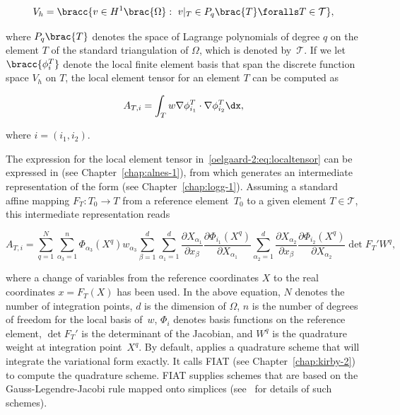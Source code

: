 \begin{equation}
  V_{h} = \bracc{v \in H^{1}\brac{\Omega}: \ v\vert_T \in P_{q}\brac{T}
    \foralls T \in \mathcal{T}},
  \label{oelgaard-2:eq:space_H1}
\end{equation}

where $P_{q}\brac{T}$ denotes the space of Lagrange polynomials of
degree $q$ on the element $T$ of the standard triangulation of
$\Omega$, which is denoted by~$\mathcal{T}$.  If we let
$\bracc{\phi^{T}_{i}}$ denote the local finite element basis that span
the discrete function space $V_{h}$ on $T$, the local element tensor
for an element $T$ can be computed as

\begin{equation}
  A_{T,i} = \int_{T} w \nabla \phi^{T}_{i_1} \cdot \nabla
  \phi^{T}_{i_2} \dx,
  \label{oelgaard-2:eq:localtensor}
\end{equation}

where $i = (i_{1}, i_{2})$.

The expression for the local element tensor
in~\eqref{oelgaard-2:eq:localtensor} can be expressed in \ufl{} (see
Chapter~\ref{chap:alnes-1}), from which \ffc{} generates an
intermediate representation of the form (see
Chapter~\ref{chap:logg-1}).  Assuming a standard affine mapping $F_T :
T_0 \rightarrow T$ from a reference element~$T_{0}$ to a given element
$T \in \mathcal{T}$, this intermediate representation reads

\begin{equation}
  A_{T,i}
  =
  \sum_{q=1}^{N}
  \sum_{\alpha_{3}=1}^n
  \Phi_{\alpha_{3}}(X^q)
  w_{\alpha_{3}}
  \sum_{\beta=1}^d
  \sum_{\alpha_1=1}^d
  \frac{\partial X_{\alpha_1}}{\partial x_{\beta}}
  \frac{\partial \Phi_{i_1}(X^q)}{\partial X_{\alpha_1}}
  \sum_{\alpha_2=1}^d
  \frac{\partial X_{\alpha_2}}{\partial x_{\beta}}
  \frac{\partial \Phi_{i_2}(X^q)}{\partial X_{\alpha_2}}
  \det F_T'
  W^q,
\label{oelgaard-2:eq:weightedlaplacian_quadraturerepresentation}
\end{equation}

where a change of variables from the reference coordinates $X$ to the
real coordinates $x = F_T(X)$ has been used. In the above equation,
$N$ denotes the number of integration points, $d$ is the dimension of
$\Omega$, $n$ is the number of degrees of freedom for the local basis
of~$w$, $\Phi_{i}$ denotes basis functions on the reference element,
$\det F_T'$ is the determinant of the Jacobian, and $W^q$ is the
quadrature weight at integration point~$X^q$.  By default, \ffc{}
applies a quadrature scheme that will integrate the variational form
exactly.  It calls FIAT (see Chapter~\ref{chap:kirby-2}) to compute
the quadrature scheme.  FIAT supplies schemes that are based on the
Gauss-Legendre-Jacobi rule mapped onto simplices
(see~\citet{KarniadakisSherwin2005} for details of such schemes).


